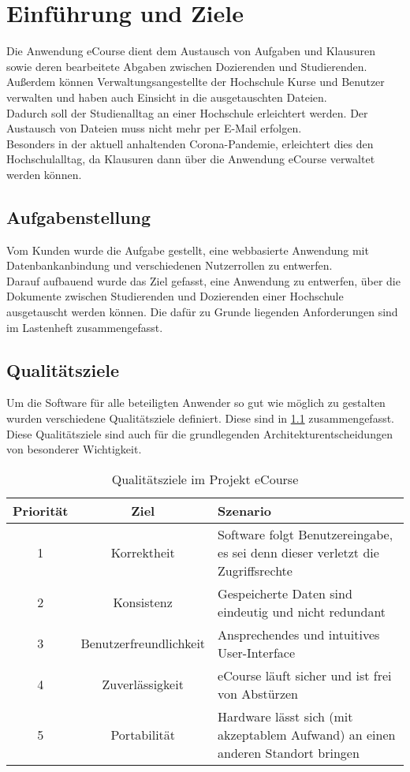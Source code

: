 
\chapter{Einführung und Ziele}
Die Anwendung eCourse dient dem Austausch von \gls{Aufgabe}n und \gls{Klausur}en sowie deren \gls{bearbeitete Abgabe}n zwischen \gls{Dozierende}n und \gls{Studierende}n. Außerdem können \gls{Verwaltungsangestellte der Hochschule} \gls{Kurs}e und Benutzer verwalten und haben auch Einsicht in die ausgetauschten Dateien. \\
Dadurch soll der Studienalltag an einer Hochschule erleichtert werden. Der Austausch von Dateien muss nicht mehr per E-Mail erfolgen. \\
Besonders in der aktuell anhaltenden Corona-Pandemie, erleichtert dies den Hochschulalltag, da \gls{Klausur}en dann über die Anwendung eCourse verwaltet werden können.  

\section{Aufgabenstellung}
\label{sec:Aufgabe}
Vom Kunden wurde die Aufgabe gestellt, eine webbasierte Anwendung mit Datenbankanbindung und verschiedenen Nutzerrollen zu entwerfen. \\
Darauf aufbauend wurde das Ziel gefasst, eine Anwendung zu entwerfen, über die Dokumente zwischen \gls{Studierende}n und \gls{Dozierende}n einer Hochschule ausgetauscht werden können. Die dafür zu Grunde liegenden Anforderungen sind im Lastenheft zusammengefasst.

\section{Qualitätsziele}
\label{sec:Quali}
Um die Software für alle beteiligten Anwender so gut wie möglich zu gestalten wurden verschiedene Qualitätsziele definiert. Diese sind in \ref{tab:Qualitätsziele} zusammengefasst. Diese Qualitätsziele sind auch für die grundlegenden Architekturentscheidungen von besonderer Wichtigkeit.

\begin{table}[H]
\centering
\begin{tabularx}{\textwidth}[H]{|c|c|X|}
\hline
Priorität &	Ziel & Szenario\\
\hline
1 & Korrektheit & Software folgt Benutzereingabe, es sei denn dieser verletzt die Zugriffsrechte \\
\hline
2 & Konsistenz & Gespeicherte Daten sind eindeutig und nicht redundant \\
\hline
3 & Benutzerfreundlichkeit & Ansprechendes und intuitives User-Interface \\
\hline
4 & Zuverlässigkeit & eCourse läuft sicher und ist frei von Abstürzen \\
\hline
5 & Portabilität & Hardware lässt sich (mit akzeptablem Aufwand) an einen anderen Standort bringen\\
\hline
\end{tabularx}
\caption{Qualitätsziele im Projekt eCourse}
\label{tab:Qualitätsziele}
\end{table}

